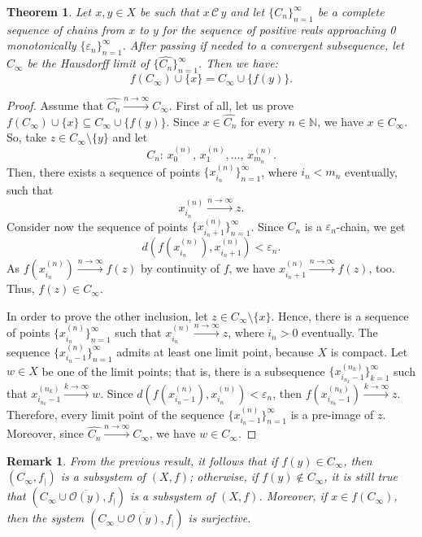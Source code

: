 \documentclass[10pt,a4paper]{article}
\theoremstyle{definition}
\theoremstyle{remark}
\theoremstyle{plain}
\newtheorem{thm}[defi]{Theorem}
\newtheorem{rem}[defi]{Remark}
\begin{document}
\begin{thm}\label{C_infty subsystem}
    Let $x,y\in X$ be such that $x\,\mathcal{C}\,y$ and let $\{C_n\}_{n=1}^\infty$ be a complete sequence of chains from $x$ to $y$ for the sequence of positive reals approaching 0 monotonically $\{\varepsilon_n\}_{n=1}^\infty$. After passing if needed to a convergent subsequence, let $C_\infty$ be the Hausdorff limit of $\{\widehat{C_n}\}_{n=1}^\infty$. Then we have: $$f(C_\infty)\cup\{x\}=C_\infty\cup\{f(y)\}.$$
\end{thm}
\begin{proof}
   Assume that $\widehat{C_n}\xrightarrow{n\to\infty}C_\infty$.
    First of all, let us prove $f(C_\infty)\cup\{x\}\subseteq C_\infty\cup\{f(y)\}$. Since $x\in\widehat{C_n}$ for every $n\in\mathbb N$, we have $x\in C_\infty$. So, take $z\in C_\infty\setminus\{y\}$ and let
    $$C_n:\,x_0^{(n)},\,x_1^{(n)},\dots,\,x_{m_n}^{(n)}.$$
    Then, there exists a sequence of points $\{x^{(n)}_{i_n}\}_{n=1}^\infty$, where $i_n<m_n$ eventually, such that $$x^{(n)}_{i_n}\xrightarrow{n\to\infty}z.$$
    Consider now the sequence of points $\{x^{(n)}_{i_n+1}\}_{n=1}^\infty$. Since $C_n$ is a $\varepsilon_n$-chain, we get $$d(f(x^{(n)}_{i_n}),x^{(n)}_{i_n+1})<\varepsilon_n.$$ As $f(x^{(n)}_{i_n})\xrightarrow{n\to\infty}f(z)$ by continuity of $f$, we have $x^{(n)}_{i_n+1}\xrightarrow{n\to\infty}f(z)$, too. Thus, $f(z)\in C_\infty$.

    In order to prove the other inclusion, let $z\in C_\infty\setminus\{x\}$. Hence, there is a sequence of points $\{x^{(n)}_{i_n}\}_{n=1}^\infty$ such that $x^{(n)}_{i_n}\xrightarrow{n\to\infty}z$, where $i_n>0$ eventually. The sequence $\{x^{(n)}_{i_n-1}\}_{n=1}^\infty$ admits at least one limit point, because $X$ is compact. Let $w\in X$ be one of the limit points; that is, there is a subsequence $\{x^{(n_k)}_{i_{n_k}-1}\}_{k=1}^\infty$ such that $x^{(n_k)}_{i_{n_k}-1}\xrightarrow{k\to\infty}w$. Since $d(f(x^{(n)}_{i_n-1}),x^{(n)}_{i_n})<\varepsilon_n$, then $f(x^{(n_k)}_{i_{n_k}-1})\xrightarrow{k\to\infty}z$. Therefore, every limit point of the sequence $\{x^{(n)}_{i_n-1}\}_{n=1}^\infty$ is a pre-image of $z$. Moreover, since $\widehat{C_n}\xrightarrow{n\to\infty}C_\infty$, we have $w\in C_\infty$.
\end{proof}
\begin{rem}
    From the previous result, it follows that if $f(y)\in C_\infty$, then $(C_\infty,f_\vert)$ is a subsystem of $(X,f)$; otherwise, if $f(y)\notin C_\infty$, it is still true that $(C_\infty\cup\overline{\mathcal{O}(y)},f_\vert)$ is a subsystem of $(X,f)$. Moreover, if $x\in f(C_\infty)$, then the system $(C_\infty\cup\overline{\mathcal{O}(y)},f_{\vert})$ is surjective.
\end{rem}
\end{document}
